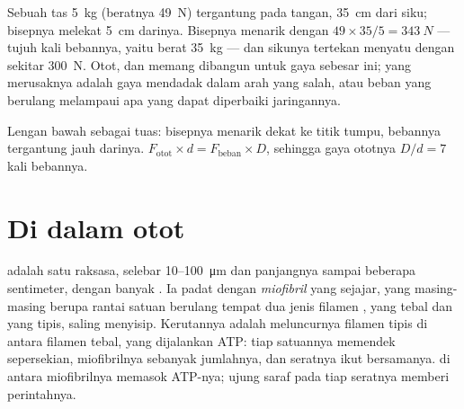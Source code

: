 \begin{example}\label{ex:g10:muscles-and-joints:bag}
Sebuah tas \qty{5}{kg} (beratnya \qty{49}{N}) tergantung pada tangan,
\qty{35}{cm} dari siku;  bisepnya melekat \qty{5}{cm} darinya.
Bisepnya menarik dengan $49 \times 35/5 = \qty{343}{N}$ --- tujuh kali
bebannya, yaitu berat \qty{35}{kg} --- dan  sikunya tertekan
menyatu dengan sekitar \qty{300}{N}. Otot,  dan 
memang dibangun untuk gaya sebesar ini; yang merusaknya adalah gaya
mendadak dalam arah yang salah, atau beban yang berulang melampaui apa
yang dapat diperbaiki jaringannya.
\end{example}

\begin{omfigure}

{\small Lengan bawah sebagai tuas: bisepnya menarik dekat ke titik
tumpu, bebannya tergantung jauh darinya. $F_{\text{otot}} \times d =
F_{\text{beban}} \times D$, sehingga gaya ototnya $D/d = 7$ kali
bebannya.}
\end{omfigure}

\section{Di dalam otot}

\begin{proposition}\label{prop:g10:muscles-and-joints:fibre}
 adalah satu  raksasa, selebar \num{10}--\qty{100}{\micro m}
dan panjangnya sampai beberapa sentimeter, dengan banyak . Ia
padat dengan \emph{miofibril} yang sejajar, yang masing-masing berupa
rantai satuan berulang tempat dua jenis filamen , yang tebal dan
yang tipis, saling menyisip. Kerutannya adalah meluncurnya filamen
tipis di antara filamen tebal, yang dijalankan ATP: tiap satuannya
memendek sepersekian, miofibrilnya sebanyak jumlahnya, dan seratnya
ikut bersamanya.  di antara miofibrilnya memasok ATP-nya;
ujung saraf pada tiap seratnya memberi perintahnya.
\end{proposition}
\admitted

